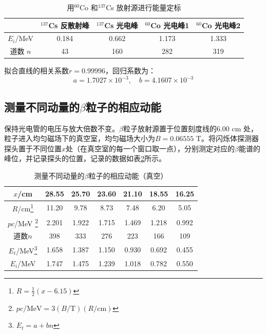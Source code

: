 \documentclass[aps,pre,12pt,preprint,onecolumn,showpacs,showkeys]{revtex4-1}
\begin{document}
    \begin{table}[h]
        \caption{\label{tab:Co60_Cs137}%
        用$^{60}$Co 和$^{137}$Cs 放射源进行能量定标}
        \begin{tabular}{|c|c|c|c|c|}
            \hline
            & $^{137}$Cs 反散射峰 & $^{137}$Cs 光电峰 & $^{60}$Co 光电峰1 & $^{60}$Co 光电峰2\\\hline
        $E_i$/MeV & 0.184 & 0.662 & 1.173 & 1.333\\\hline
        道数 $n$ & 43 & 160 & 282 & 319 \\\hline
        \end{tabular}
    \end{table}
    拟合直线的相关系数$r=0.99996$，回归系数为：
    \begin{equation}
        a=1.7027 \times 10 ^{-3}, \quad b=4.1607 \times 10 ^{-3} 
    \end{equation}

    \subsection{测量不同动量的$\beta$粒子的相应动能}
    保持光电管的电压与放大倍数不变。$\beta$粒子放射源置于位置刻度线的$6.00$ cm 处，粒子进入均匀磁场下的真空室，均匀磁场大小为$B=0.06555$ T。将闪烁体探测器探头置于不同位置$x$处（在真空室的每一个窗口取一点），分别测定对应的$\beta$能谱的峰位，并记录探头的位置，记录的数据如表\ref{tab:beta}所示。

    \begin{table}[h]
        \caption{\label{tab:beta}%
        测量不同动量的$\beta$粒子的相应动能（真空）}
        \begin{tabular}{|c|c|c|c|c|c|c|}
            \hline
            $x$/cm & 28.55 & 25.70 & 23.60 & 21.10 & 18.55 & 16.25\\\hline 
            $R$/cm\footnote{$R=\frac{1}{2}(x-6.15)$} & 11.20 & 9.78 & 8.73 & 7.48 & 6.20 & 5.05\\\hline
            $pc$/MeV \footnote{$pc/\mathrm{MeV}=3(B/\mathrm{T})(R/\mathrm{cm})$}& 2.201 & 1.922 & 1.715 & 1.469 & 1.218 & 0.992\\\hline
            道数$n$ & 398 & 333 & 276 & 223 & 166 & 109 \\\hline
            $E_t$/MeV\footnote{$E_t=a+bn$} & 1.658 & 1.387 & 1.150 & 0.930 & 0.692 & 0.455 \\\hline
            $E_i$/MeV & 1.747 & 1.475 & 1.239 & 1.018 & 0.782 & 0.550 \\\hline
        \end{tabular}
    \end{table}
\end{document}
